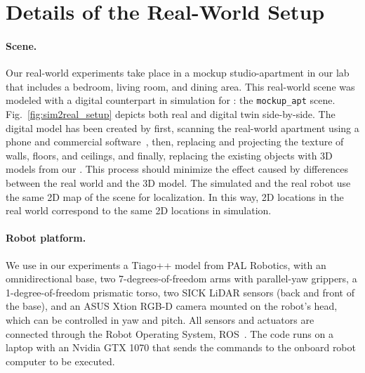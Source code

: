 \section{Details of the Real-World Setup}
\label{as:s2r}

\paragraph{Scene.} Our real-world experiments take place in a mockup studio-apartment in our lab that includes a bedroom, living room, and dining area. 
This real-world scene was modeled with a digital counterpart in simulation for \benchmark: the \texttt{mockup\_apt} scene. Fig.~\ref{fig:sim2real_setup} depicts both real and digital twin side-by-side. The digital model has been created by first, scanning the real-world apartment using a phone and commercial software~\cite{scaniverse}, then, replacing and projecting the texture of walls, floors, and ceilings, and finally, replacing the existing objects with 3D models from our \dataset. This process should minimize the effect caused by differences between the real world and the 3D model. The simulated and the real robot use the same 2D map of the scene for localization. In this way, 2D locations in the real world correspond to the same 2D locations in simulation. 

\paragraph{Robot platform.} We use in our experiments a Tiago++ model from PAL Robotics, with an omnidirectional base, two 7-degrees-of-freedom arms with parallel-yaw grippers, a 1-degree-of-freedom prismatic torso, two SICK LiDAR sensors (back and front of the base), and an ASUS Xtion RGB-D camera mounted on the robot's head, which can be controlled in yaw and pitch.
All sensors and actuators are connected through the Robot Operating System, ROS~\cite{quigley2009ros}. The code runs on a laptop with an Nvidia GTX 1070 that sends the commands to the onboard robot computer to be executed.


